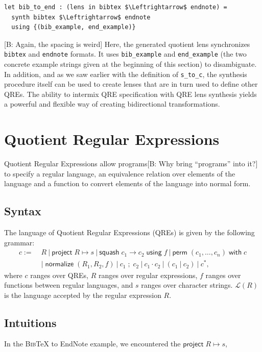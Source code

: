 \documentclass[acmsmall,review,anonymous]{acmart}
\newcommand{\FINISH}[3]{\ifdraft\textcolor{#1}{[#2: #3]}\fi}
\newcommand{\bcp}[1]{\FINISH{dkred}{B}{#1}}
\newcommand{\kw}[1]{\ensuremath{\mathsf{#1}}}
\newcommand{\project}[2]{\ensuremath{\kw{project} \; #1 \mapsto #2}}
\newcommand{\squash}[3]{\ensuremath{\kw{squash} \; #1 \rightarrow #2\; \kw{using} \; #3}}
\newcommand{\perm}[2]{\ensuremath{\kw{perm}\; (#1)\; \kw{with}\; #2}}
\newcommand{\normalize}[3]{\ensuremath{\kw{normalize} \; (#1, #2, #3)}}
\newcommand{\sep}{\ensuremath{\ | \ }}
\newcommand{\bibtex}{\textsc{Bib}\TeX{}}
\newcommand{\semicolon}{\ensuremath{\; ; \;}}
\newcommand{\cd}[1]{\lstinline[backgroundcolor=\color{white}]$#1$}
\begin{document}
\begin{lstlisting}
let bib_to_end : (lens in bibtex $\Leftrightarrow$ endnote) =
  synth bibtex $\Leftrightarrow$ endnote
  using {(bib_example, end_example)}
\end{lstlisting}
\bcp{Again, the spacing is weird}
\noindent Here, the generated  quotient lens synchronizes \cd{bibtex} and
\cd{endnote} formats.  It uses \cd{bib_example} and \cd{end_example} (the two concrete example
strings given at the beginning of this section) to disambiguate.
In addition, and as we saw earlier with the definition of \cd{s_to_c}, the synthesis procedure itself
can be used to create lenses that are in turn used to define other QREs.  The ability to intermix
QRE specification with QRE lens synthesis yields a powerful and flexible way of
creating bidirectional transformations.

\section{Quotient Regular Expressions}
\label{QRE}

Quotient Regular Expressions allow programs\bcp{Why bring ``programs'' into
  it?} to specify a regular language,
an equivalence relation over elements of the language and a function to convert
elements of the language into normal form.

\subsection{Syntax}

The language of Quotient Regular Expressions (QREs) is given by the following
grammar:
\begin{align*}
c := \; &R \sep \project{R}{s} \sep \squash{c_1}{c_2}{f} \sep
\perm{c_1, \ldots, c_n}{c} \\
& | \; \normalize{R_1}{R_2}{f} \sep c_1 \semicolon c_2 \sep c_1 \cdot c_2 \sep (c_1 \sep
c_2) \sep c^*,
\end{align*}
where $c$ ranges over QREs, $R$ ranges over regular expressions, $f$ ranges over
functions between regular languages, and $s$ ranges over character strings.
$\mathcal{L}(R)$ is
the language accepted by the regular expression $R$.


\subsection{Intuitions}
In the \bibtex{} to EndNote example, we encountered the $\project{R}{s}$,
\end{document}
